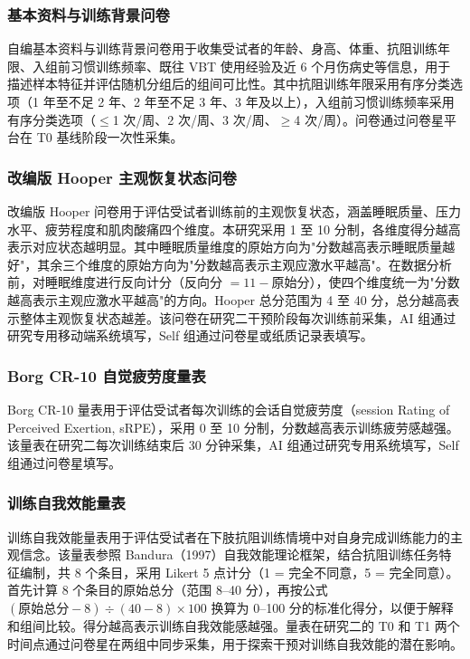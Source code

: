 \documentclass[UTF8,zihao=-4,twoside,openany]{ctexbook}
\begin{document}
\subsubsection{基本资料与训练背景问卷}
自编基本资料与训练背景问卷用于收集受试者的年龄、身高、体重、抗阻训练年限、入组前习惯训练频率、既往 VBT 使用经验及近 6 个月伤病史等信息，用于描述样本特征并评估随机分组后的组间可比性。其中抗阻训练年限采用有序分类选项（1 年至不足 2 年、2 年至不足 3 年、3 年及以上），入组前习惯训练频率采用有序分类选项（$\le$1 次/周、2 次/周、3 次/周、$\ge$4 次/周）。问卷通过问卷星平台在 T0 基线阶段一次性采集。

\subsubsection{改编版 Hooper 主观恢复状态问卷}
改编版 Hooper 问卷用于评估受试者训练前的主观恢复状态，涵盖睡眠质量、压力水平、疲劳程度和肌肉酸痛四个维度。本研究采用 1 至 10 分制，各维度得分越高表示对应状态越明显。其中睡眠质量维度的原始方向为"分数越高表示睡眠质量越好"，其余三个维度的原始方向为"分数越高表示主观应激水平越高"。在数据分析前，对睡眠维度进行反向计分（反向分 $= 11 - \text{原始分}$），使四个维度统一为"分数越高表示主观应激水平越高"的方向。Hooper 总分范围为 4 至 40 分，总分越高表示整体主观恢复状态越差。该问卷在研究二干预阶段每次训练前采集，AI 组通过研究专用移动端系统填写，Self 组通过问卷星或纸质记录表填写。

\subsubsection{Borg CR-10 自觉疲劳度量表}
Borg CR-10 量表用于评估受试者每次训练的会话自觉疲劳度（session Rating of Perceived Exertion, sRPE），采用 0 至 10 分制，分数越高表示训练疲劳感越强。该量表在研究二每次训练结束后 30 分钟采集，AI 组通过研究专用系统填写，Self 组通过问卷星填写。

\subsubsection{训练自我效能量表}
训练自我效能量表用于评估受试者在下肢抗阻训练情境中对自身完成训练能力的主观信念。该量表参照 Bandura（1997）自我效能理论框架，结合抗阻训练任务特征编制，共 8 个条目，采用 Likert 5 点计分（1 = 完全不同意，5 = 完全同意）。首先计算 8 个条目的原始总分（范围 8--40 分），再按公式 $(\text{原始总分} - 8) \div (40 - 8) \times 100$ 换算为 0--100 分的标准化得分，以便于解释和组间比较。得分越高表示训练自我效能感越强。量表在研究二的 T0 和 T1 两个时间点通过问卷星在两组中同步采集，用于探索干预对训练自我效能的潜在影响。
\end{document}
